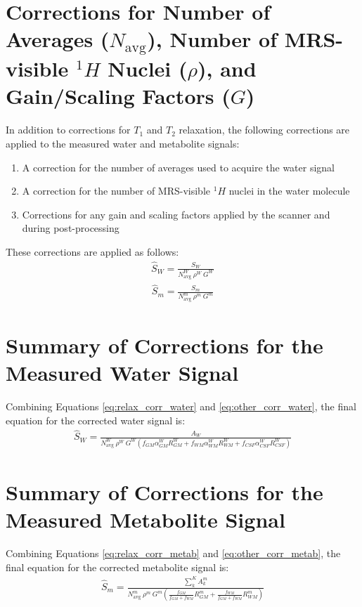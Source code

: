 \documentclass{article}
\begin{document}
\section{Corrections for Number of Averages ($N_\text{avg}$), Number of MRS-visible $^1H$ Nuclei ($\rho$), and Gain/Scaling Factors ($G$)}
In addition to corrections for $T_1$ and $T_2$ relaxation, the following corrections are applied to the measured water and metabolite signals:
\begin{enumerate}
	\item A correction for the number of averages used to acquire the water signal
	\item A correction for the number of MRS-visible $^1H$ nuclei in the water molecule
	\item Corrections for any gain and scaling factors applied by the scanner and during post-processing
\end{enumerate}

These corrections are applied as follows:
\begin{align}
	\boxed{\hat{S}_W = \frac{S_W}{N_\text{avg}^{W} ~ \rho^W ~ G^W}}
	\label{eq:other_corr_water}
\end{align}
\begin{align}
	\boxed{\hat{S}_m = \frac{S_m}{N_\text{avg}^{m} ~ \rho^m ~ G^m}}
	\label{eq:other_corr_metab}
\end{align}

\section{Summary of Corrections for the Measured Water Signal}
Combining Equations \eqref{eq:relax_corr_water} and \eqref{eq:other_corr_water}, the final equation for the corrected water signal is:
\begin{align}
	\boxed{\hat{S}_W = \frac{A_W}{N_\text{avg}^W ~ \rho^W ~ G^W \left(f_{GM} \alpha_{GM}^{W} R_{GM}^{W} + f_{WM} \alpha_{WM}^{W} R_{WM}^{W} + f_{CSF} \alpha_{CSF}^{W}  R_{CSF}^{W}\right)}}
	\label{eq:water_corrected}
\end{align}

\section{Summary of Corrections for the Measured Metabolite Signal}
Combining Equations \eqref{eq:relax_corr_metab} and \eqref{eq:other_corr_metab}, the final equation for the corrected metabolite signal is:
\begin{align}
	\boxed{\hat{S}_m = \frac{\sum_k^K A_k^m}{N_\text{avg}^{m} ~ \rho^m ~ G^m \left(\frac{f_{GM}}{f_{GM}+f_{WM}} R_{GM}^{m} + \frac{f_{WM}}{f_{GM}+f_{WM}}  R_{WM}^{m}\right)}}
	\label{eq:metab_corrected}
\end{align}
\end{document}
